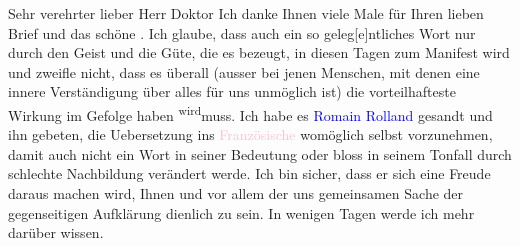 \pstart{}Sehr verehrter lieber Herr Doktor\pend\vspace{0.5em}
\pstart
           Ich danke Ihnen viele Male für Ihren lieben Brief und das schöne \label{K_L03683-1v}\label{}. Ich
               glaube, dass auch ein so geleg{[}e{]}ntliches Wort nur durch den Geist
               und die Güte, die es bezeugt, in diesen Tagen zum Manifest wird und zweifle nicht,
               dass es überall (ausser bei jenen Menschen, mit denen eine innere Verständigung über
               alles für uns unmöglich ist) die vorteilhafteste Wirkung im Gefolge haben \substVorne{}\textsuperscript{wird}\substDazwischen{}muss\substHinten{}. Ich habe es \textcolor{blue}{Romain Rolland}{}\ledrightnote{\textcolor{blue}{Romain Rolland}} gesandt
               und ihn gebeten, die Uebersetzung ins \textcolor{pink}{Französische}{}\ledrightnote{\textcolor{pink}{Frankreich}} womöglich selbst vorzunehmen, damit auch nicht ein Wort in
               seiner Bedeutung oder bloss \introOben{}in\introOben{} seinem Tonfall durch
               schlechte Nachbildung verändert werde. Ich bin sicher, dass er sich eine Freude
               daraus machen wird\introOben{},\introOben{} Ihnen und vor allem der uns gemeinsamen
               Sache der gegenseitigen Aufklärung dienlich zu sein. In wenigen Tagen werde ich mehr
               darüber wissen.\pend
           
